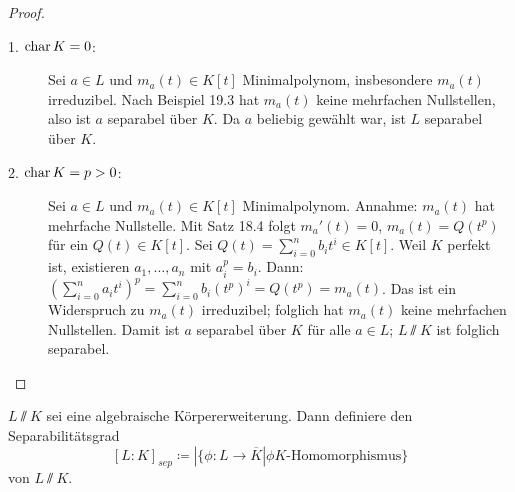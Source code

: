 \documentclass[12pt,a4paper]{scrartcl}
\begin{document}
\begin{proof}
	\leavevmode
	\begin{description}
		\item[1. $\operatorname{char} K = 0$:] Sei $a\in L$ und $m_a(t) \in K[t]$ Minimalpolynom, insbesondere $m_a(t)$ irreduzibel. Nach Beispiel 19.3 hat $m_a(t)$ keine mehrfachen Nullstellen, also ist $a$ separabel über $K$. Da $a$ beliebig gewählt war, ist $L$ separabel über $K$.
		\item[2. $\operatorname{char} K = p>0$:] Sei $a\in L$ und $m_a(t)\in K[t]$ Minimalpolynom. Annahme: $m_a(t)$ hat mehrfache Nullstelle. Mit Satz 18.4 folgt $m_a'(t) = 0$, $m_a(t) = Q(t^p)$ für ein $Q(t)\in K[t]$. Sei $Q(t)  =\sum_{i = 0}^n b_it^i\in K[t]$. Weil $K$ perfekt ist, existieren $a_1, \dots, a_n$ mit $a_i^p = b_i$. Dann: $(\sum_{i = 0}^na_it^i)^p = \sum_{i = 0}^nb_i(t^p)^i = Q(t^p) = m_a(t)$. Das ist ein Widerspruch zu $m_a(t)$ irreduzibel; folglich hat $m_a(t)$ keine mehrfachen Nullstellen. Damit ist $a$ separabel über $K$ für alle $a\in L$; $L\sslash K$ ist folglich separabel.
	\end{description}
\end{proof}

\begin{defi}
	$L\sslash K$ sei eine algebraische Körpererweiterung. Dann definiere den Separabilitätsgrad
	$$[L:K]_{sep} \coloneqq |\{\phi\colon L\to\overline{K}|\phi K\text{-Homomorphismus}\}$$
	von $L\sslash K$.
\end{defi}
\end{document}
